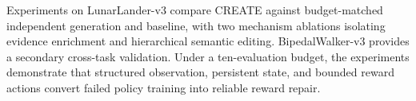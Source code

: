 Experiments on LunarLander-v3 compare CREATE against budget-matched independent generation and baseline, with two mechanism ablations isolating evidence enrichment and hierarchical semantic editing. BipedalWalker-v3 provides a secondary cross-task validation. Under a ten-evaluation budget, the experiments demonstrate that structured observation, persistent state, and bounded reward actions convert failed policy training into reliable reward repair.
